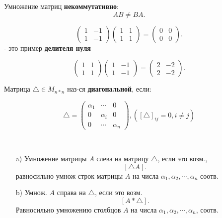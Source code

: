 \begin{note}
Умножение матриц \textbf{некоммутативно}:
\[
AB \neq BA
.\] 
\begin{example}
\[
    \begin{pmatrix} 1 & -1 \\ 1 & -1 \end{pmatrix}
    \begin{pmatrix} 1 & 1 \\ 1 & 1 \end{pmatrix} =
    \begin{pmatrix} 0 & 0 \\ 0 & 0 \end{pmatrix}
.\] 
- это пример \textbf{делителя нуля}

\[
    \begin{pmatrix} 1 & 1 \\ 1 & 1 \end{pmatrix}
    \begin{pmatrix} 1 & -1 \\ 1 & -1 \end{pmatrix} = 
    \begin{pmatrix} 2 & -2 \\ 2 & -2 \end{pmatrix}
.\] 
\end{example}

\end{note}

\begin{definition}
Матрица $\triangle \in M_{n * n}$ наз-ся \textbf{диагональной}, если:

\[
    \triangle = \begin{pmatrix} \alpha_1 & \cdots & 0 \\
    0 & \alpha_i & 0 \\
0 & \cdots & \alpha_n\end{pmatrix}, ([\triangle]_{ij} = 0, i \neq j) 
\]
\end{definition}

\begin{statement}
    ~\newline
    
\begin{itemize}
    \item[a) ] Умножение матрицы $A$ слева на матрицу $\triangle$, если это возм.,
        \[
        [\triangle A]
        .\]
        равносильно умнож строк матрицы $A$ на числа $\alpha_1, \alpha_2, \cdots, \alpha_n$ соотв.
    \item[b) ] Умнож. $A$ справа на $\triangle$, если это возм.
        \[
        [A * \triangle ]
        .\] 
        Равносильно умножению столбцов $A$ на числа $\alpha_1, \alpha_2, \cdots, \alpha_n$, соотв. 
\end{itemize}
\end{statement}
